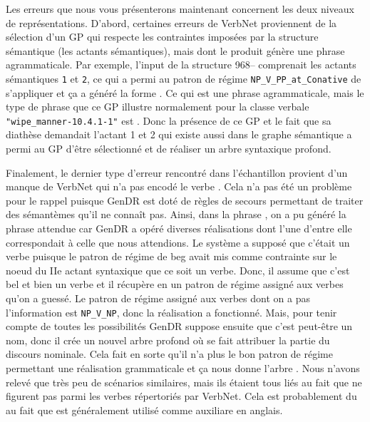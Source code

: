 Les erreurs que nous vous présenterons maintenant concernent les deux niveaux de représentations. D'abord, certaines erreurs de VerbNet proviennent de la sélection d'un \ac{GP} qui respecte les contraintes imposées par la structure sémantique (les actants sémantiques), mais dont le produit génère une phrase agrammaticale. Par exemple, l'input de la structure 968-- comprenait les actants sémantiques \texttt{1} et \texttt{2}, ce qui a permi au patron de régime \texttt{NP\_V\_PP\_at\_Conative} de s'appliquer et ça a généré la forme . Ce qui est une phrase agrammaticale, mais le type de phrase que ce \ac{GP} illustre normalement pour la classe verbale \texttt{"wipe\_manner-10.4.1-1"} est . Donc la présence de ce \ac{GP} et le fait que sa diathèse demandait l'actant 1 et 2 qui existe aussi dans le graphe sémantique a permi au \ac{GP} d'être sélectionné et de réaliser un arbre syntaxique profond.


Finalement, le dernier type d'erreur rencontré dans l'échantillon provient d'un manque de VerbNet qui n'a pas encodé le verbe . Cela n'a pas été un problème pour le rappel puisque GenDR est doté de règles de secours permettant de traiter des sémantèmes qu'il ne connaît pas. Ainsi, dans la phrase 
, on a pu généré la phrase attendue car GenDR a opéré diverses réalisations dont l'une d'entre elle correspondait à celle que nous attendions. Le système a supposé que c'était un verbe puisque le patron de régime de beg avait mis comme contrainte sur le noeud du IIe actant syntaxique que ce soit un verbe. Donc, il assume que c'est bel et bien un verbe et il récupère en un patron de régime assigné aux verbes qu'on a guessé. Le patron de régime assigné aux verbes dont on a pas l'information est \texttt{NP\_V\_NP}, donc la réalisation a fonctionné. Mais, pour tenir compte de toutes les possibilités GenDR suppose ensuite que c'est peut-être un nom, donc il crée un nouvel arbre profond où  se fait attribuer la partie du discours nominale. Cela fait en sorte qu'il n'a plus le bon patron de régime permettant une réalisation grammaticale et ça nous donne l'arbre . Nous n'avons relevé que très peu de scénarios similaires, mais ils étaient tous liés au fait que  ne figurent pas parmi les verbes répertoriés par VerbNet. Cela est probablement du au fait que  est généralement utilisé comme auxiliare en anglais.

